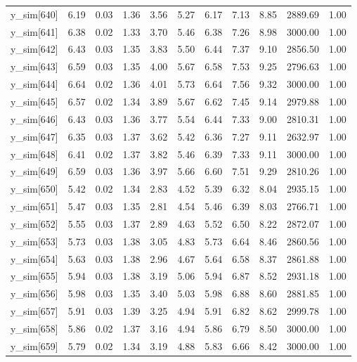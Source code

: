 \begin{table}[ht]
\begin{tabular}{rrrrrrrrrrr}
  y\_sim[640] & 6.19 & 0.03 & 1.36 & 3.56 & 5.27 & 6.17 & 7.13 & 8.85 & 2889.69 & 1.00 \\ 
  y\_sim[641] & 6.38 & 0.02 & 1.33 & 3.70 & 5.46 & 6.38 & 7.26 & 8.98 & 3000.00 & 1.00 \\ 
  y\_sim[642] & 6.43 & 0.03 & 1.35 & 3.83 & 5.50 & 6.44 & 7.37 & 9.10 & 2856.50 & 1.00 \\ 
  y\_sim[643] & 6.59 & 0.03 & 1.35 & 4.00 & 5.67 & 6.58 & 7.53 & 9.25 & 2796.63 & 1.00 \\ 
  y\_sim[644] & 6.64 & 0.02 & 1.36 & 4.01 & 5.73 & 6.64 & 7.56 & 9.32 & 3000.00 & 1.00 \\ 
  y\_sim[645] & 6.57 & 0.02 & 1.34 & 3.89 & 5.67 & 6.62 & 7.45 & 9.14 & 2979.88 & 1.00 \\ 
  y\_sim[646] & 6.43 & 0.03 & 1.36 & 3.77 & 5.54 & 6.44 & 7.33 & 9.00 & 2810.31 & 1.00 \\ 
  y\_sim[647] & 6.35 & 0.03 & 1.37 & 3.62 & 5.42 & 6.36 & 7.27 & 9.11 & 2632.97 & 1.00 \\ 
  y\_sim[648] & 6.41 & 0.02 & 1.37 & 3.82 & 5.46 & 6.39 & 7.33 & 9.11 & 3000.00 & 1.00 \\ 
  y\_sim[649] & 6.59 & 0.03 & 1.36 & 3.97 & 5.66 & 6.60 & 7.51 & 9.29 & 2810.26 & 1.00 \\ 
  y\_sim[650] & 5.42 & 0.02 & 1.34 & 2.83 & 4.52 & 5.39 & 6.32 & 8.04 & 2935.15 & 1.00 \\ 
  y\_sim[651] & 5.47 & 0.03 & 1.35 & 2.81 & 4.54 & 5.46 & 6.39 & 8.03 & 2766.71 & 1.00 \\ 
  y\_sim[652] & 5.55 & 0.03 & 1.37 & 2.89 & 4.63 & 5.52 & 6.50 & 8.22 & 2872.07 & 1.00 \\ 
  y\_sim[653] & 5.73 & 0.03 & 1.38 & 3.05 & 4.83 & 5.73 & 6.64 & 8.46 & 2860.56 & 1.00 \\ 
  y\_sim[654] & 5.63 & 0.03 & 1.38 & 2.96 & 4.67 & 5.64 & 6.58 & 8.37 & 2861.88 & 1.00 \\ 
  y\_sim[655] & 5.94 & 0.03 & 1.38 & 3.19 & 5.06 & 5.94 & 6.87 & 8.52 & 2931.18 & 1.00 \\ 
  y\_sim[656] & 5.98 & 0.03 & 1.35 & 3.40 & 5.03 & 5.98 & 6.88 & 8.60 & 2881.85 & 1.00 \\ 
  y\_sim[657] & 5.91 & 0.03 & 1.39 & 3.25 & 4.94 & 5.91 & 6.82 & 8.62 & 2999.78 & 1.00 \\ 
  y\_sim[658] & 5.86 & 0.02 & 1.37 & 3.16 & 4.94 & 5.86 & 6.79 & 8.50 & 3000.00 & 1.00 \\ 
  y\_sim[659] & 5.79 & 0.02 & 1.34 & 3.19 & 4.88 & 5.83 & 6.66 & 8.42 & 3000.00 & 1.00 \\ 

\end{tabular}
\end{table}
